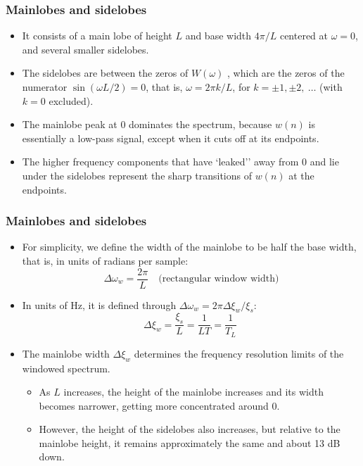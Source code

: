 \begin{frame}
\frametitle{Mainlobes and sidelobes}
\begin{itemize}
\item It consists of a \alert{main lobe} of height $L$ and base width $4\pi/L$ centered at $\omega=0$, and several smaller \alert{sidelobes}.
\item The sidelobes are between the zeros of $W(\omega)$ , which are the zeros of the numerator $\sin(\omega L/2)=0$, that is, $\omega=2\pi k/L$, for $k=\pm 1, \pm 2,\ \ldots$ (with $k=0$ excluded).
\item The mainlobe peak at $0$ dominates the spectrum, because $w(n)$ is essentially a low-pass  signal, except when it cuts off at its endpoints.
\item The higher frequency components that have `leaked'' away from $0$ and lie under the sidelobes represent the sharp transitions of $w(n)$ at the endpoints.
\end{itemize}
\end{frame}

\begin{frame}
\frametitle{Mainlobes and sidelobes}
\begin{itemize}
\item  For simplicity, we  define the width of the mainlobe  to be half the base width, that is, in units of radians per sample:
$$
\Delta\omega_{w}=\frac{2\pi}{L} \quad \text{(rectangular window width)}
$$
\item In units of Hz, it is defined through $\Delta\omega_{w}=2\pi\Delta \xi_{w}/\xi_{s}$:
$$
\Delta \xi_{w}=\frac{\xi_{s}}{L}=\frac{1}{LT}=\frac{1}{T_{L}}\
$$
\item The mainlobe width $\Delta \xi_{w}$ determines the \alert{frequency resolution limits} of the windowed spectrum.
\begin{itemize}
\item As $L$ increases, the height of the mainlobe increases and its width becomes narrower, getting more concentrated around 0.
\item However, the height of the sidelobes also increases, but \alert{relative} to the mainlobe height, it remains approximately the same and about 13 dB down.
\end{itemize}
\end{itemize}
\end{frame}


